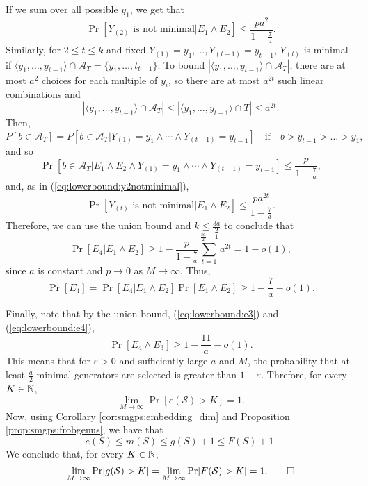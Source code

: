\begin{itemize}
    If we sum over all possible $y_1$, we get that 
    \begin{equation}\label{eq:lowerbound:y2notminimal}
        \Pr[Y_{(2)} \text{ is not minimal}|E_1\land E_2] \leq \frac{pa^2}{1 - \frac{7}{a}}.
    \end{equation}
    Similarly, for $2 \leq t \leq k$ and fixed $Y_{(1)} = y_1, \ldots, Y_{(t - 1)} = y_{t - 1}$, $Y_{(t)}$ is minimal if $\langle y_1, \ldots, y_{t - 1}\rangle \cap \mathcal{A}_T = \{y_1, \ldots, t_{t - 1}\}$. To bound $|\langle y_1, \ldots, y_{t - 1}\rangle \cap \mathcal{A}_T|$, there are at most $a^2$ choices for each multiple of $y_i$, so there are at most $a^{2t}$ such linear combinations and
    \[|\langle y_1, \ldots, y_{t - 1} \rangle \cap  \mathcal{A}_T| \leq |\langle y_1, \ldots, y_{t - 1} \rangle \cap T| \leq a^{2t}.\]
    Then, 
    \[P[b \in \mathcal{A}_T] = P[b \in \mathcal{A}_T|Y_{(1)} = y_1\land \cdots \land Y_{(t - 1)} = y_{t - 1}] \quad \text{if} \quad  b > y_{t - 1} > \ldots > y_1,\]
    and so
    \[
        \Pr[b \in \mathcal{A}_T|E_1 \land E_2 \land Y_{(1)} = y_1 \land \cdots \land Y_{(t - 1)} = y_{t - 1}] \leq \frac{p}{1 - \frac{7}{a}},
    \]
    and, as in (\ref{eq:lowerbound:y2notminimal}), 
    \[\Pr[Y_{(t)} \text{ is not minimal}|E_1\land E_2] \leq \frac{pa^{2t}}{1 - \frac{7}{a}} .\]
    Therefore, we can use the union bound and $k \leq \frac{3a}{2}$ to conclude that
    \[\Pr[E_4|E_1 \land E_2] \geq 1 - \frac{p}{1 - \frac{7}{a}}\sum_{t = 1}^{\frac{3a}{2} - 1}a^{2t} = 1 - o(1),\]
    since $a$ is constant and $p \to 0$ as $M  \to \infty$.
    Thus,  
    \begin{equation}\label{eq:lowerbound:e4}
        \Pr[E_4] = \Pr[E_4| E_1 \land E_2]\Pr[E_1\land E_2] \geq 1 - \frac{7}{a} - o(1).
    \end{equation}
\end{itemize}


Finally, note that by the union bound, (\ref{eq:lowerbound:e3}) and (\ref{eq:lowerbound:e4}),
\[\Pr[E_4 \land E_3] \geq 1 - \frac{11}{a} - o(1).\] 
This means that for $\varepsilon > 0$ and sufficiently large $a$ and $M$, the probability that at least $\frac{a}{2}$ minimal generators are selected is greater than $1 - \varepsilon$. Threfore, for every $K \in \NN$, 
\[\lim_{M \to \infty} \Pr[e(\mathcal{S}) > K] = 1.\]
Now, using Corollary \ref{cor:smgps:embedding_dim} and Proposition \ref{prop:smgps:frobgenus}, we have that
\[e(S) \leq m(S) \leq g(S) + 1 \leq F(S) + 1.\]
We conclude that, for every $K \in \NN$,
\[\lim_{M \to \infty} \Pr[g(\mathcal{S}) > K] = \lim_{M \to \infty} \Pr[F(\mathcal{S}) > K] = 1.\qed\]

